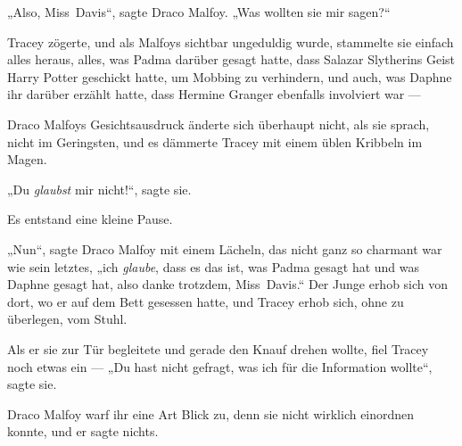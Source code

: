 „Also, Miss~Davis“, sagte Draco Malfoy.
„Was wollten sie mir sagen?“

Tracey zögerte, und als Malfoys sichtbar ungeduldig wurde, stammelte sie einfach alles heraus, alles, was Padma darüber gesagt hatte, dass Salazar Slytherins Geist Harry Potter geschickt hatte, um Mobbing zu verhindern, und auch, was Daphne ihr darüber erzählt hatte, dass Hermine Granger ebenfalls involviert war —

Draco Malfoys Gesichtsausdruck änderte sich überhaupt nicht, als sie sprach, nicht im Geringsten, und es dämmerte Tracey mit einem üblen Kribbeln im Magen.

„Du \emph{glaubst} mir nicht!“, sagte sie.

Es entstand eine kleine Pause.

„Nun“, sagte Draco Malfoy mit einem Lächeln, das nicht ganz so charmant war wie sein letztes, „ich \emph{glaube}, dass es das ist, was Padma gesagt hat und was Daphne gesagt hat, also danke trotzdem, Miss~Davis.“ Der Junge erhob sich von dort, wo er auf dem Bett gesessen hatte, und Tracey erhob sich, ohne zu überlegen, vom Stuhl.

Als er sie zur Tür begleitete und gerade den Knauf drehen wollte, fiel Tracey noch etwas ein —
„Du hast nicht gefragt, was ich für die Information wollte“, sagte sie.

Draco Malfoy warf ihr eine Art Blick zu, denn sie nicht wirklich einordnen konnte, und er sagte nichts.

